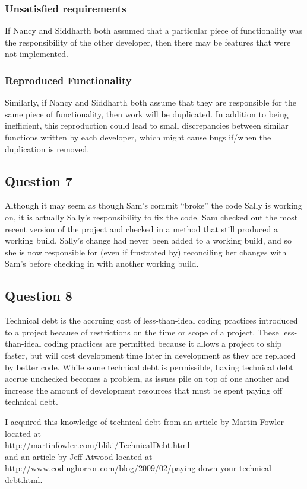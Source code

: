 \documentclass{article}
\begin{document}
\subsubsection*{Unsatisfied requirements}
If Nancy and Siddharth both assumed that a particular piece of functionality was the responsibility of the other developer, then there may be features that were not implemented.
\subsubsection*{Reproduced Functionality}
Similarly, if Nancy and Siddharth both assume that they are responsible for the same piece of functionality, then work will be duplicated.  In addition to being inefficient, this reproduction could lead to small discrepancies between similar functions written by each developer, which might cause bugs if/when the duplication is removed.

\subsection*{Question 7}
Although it may seem as though Sam's commit ``broke'' the code Sally is working on, it is actually Sally's responsibility to fix the code.  Sam checked out the most recent version of the project and checked in a method that still produced a working build.  Sally's change had never been added to a working build, and so she is now responsible for (even if frustrated by) reconciling her changes with Sam's before checking in with another working build.

\subsection*{Question 8}
Technical debt is the accruing cost of less-than-ideal coding practices introduced to a project because of restrictions on the time or scope of a project.  These less-than-ideal coding practices are permitted because it allows a project to ship faster, but will cost development time later in development as they are replaced by better code.  While some technical debt is permissible, having technical debt accrue unchecked becomes a problem, as issues pile on top of one another and increase the amount of development resources that must be spent paying off technical debt.

I acquired this knowledge of technical debt from an article by Martin Fowler located at \\
\url{http://martinfowler.com/bliki/TechnicalDebt.html} \\
and an article by Jeff Atwood located at \\
\url{http://www.codinghorror.com/blog/2009/02/paying-down-your-technical-debt.html}.
\end{document}
